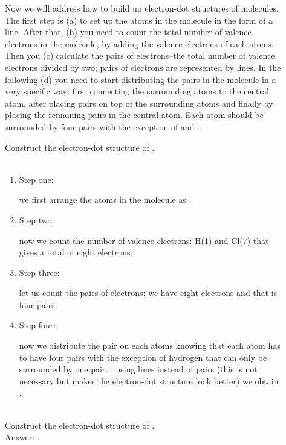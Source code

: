 \documentclass[main.tex]{subfiles}
\begin{document}
\begin{description}
\item[] Now we will address how to build up electron-dot structures of molecules. The first step is (a) to set up the atoms in the molecule in the form of a line. After that, (b) you need to count the total number of valence electrons in the molecule, by adding the valence electrons of each atoms. Then you (c) calculate the pairs of electrons--the total number of valence electrons divided by two; pairs of electrons are represented by lines. In the following (d) you need to start distributing the pairs in the molecule in a very specific way: first connecting the surrounding atoms to the central atom, after placing pairs on top of the surrounding atoms and finally by placing the remaining pairs in the central atom. Each atom should be surrounded by four pairs with the exception of  and .


\begin{example} %
Construct the electron-dot structure of .\\
\\
\begin{enumerate}[label=\protect\circled{\color{white}\arabic*}]
\item \begin{bf}Step one:\end{bf} we first arrange the atoms in the molecule as \hspace{.05in}. 
\item \begin{bf}Step two:\end{bf} now we count the number of valence electrons: H(1) and Cl(7) that gives a total of eight electrons.
 \item \begin{bf}Step three:\end{bf} let us count the pairs of electrons; we have eight electrons and that is four pairs.
\item \begin{bf}Step four:\end{bf} now we distribute the pair on each atoms knowing that each atom has to have four pairs with the exception of hydrogen that can only be surrounded by one pair.
\hspace{.05in}\hspace{.05in}, using lines instead of pairs (this is not necessary but makes the electron-dot structure look better) we obtain\\
 \hspace{.05in}.
\end{enumerate}
\faDiamond\ \\
Construct the electron-dot structure of .\\
\flushright Answer: \hspace{.05in}.
\end{example}%


\end{description}
\end{document}
